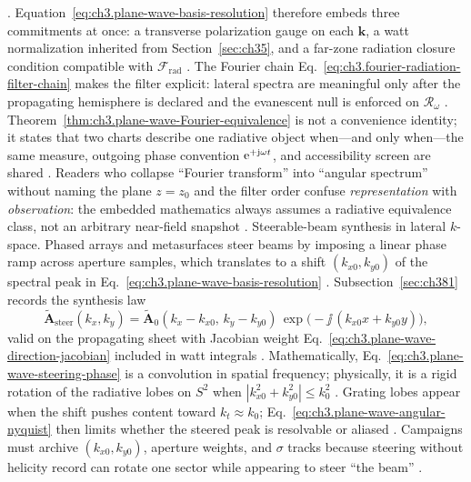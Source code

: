 \cite{harrington2001}. Equation~\eqref{eq:ch3.plane-wave-basis-resolution} therefore embeds three commitments
at once: a transverse polarization gauge on each \(\mathbf{k}\), a watt normalization inherited from
Section~\ref{sec:ch35}, and a far-zone radiation closure condition compatible with \(\mathcal{F}_{\mathrm{rad}}\)
\cite{stratton1941}. The Fourier chain
Eq.~\eqref{eq:ch3.fourier-radiation-filter-chain} makes the filter explicit: lateral spectra are meaningful only after
the propagating hemisphere is declared and the evanescent null is enforced on \(\mathcal{R}_\omega\)
\cite{harrington2001}. Theorem~\ref{thm:ch3.plane-wave-Fourier-equivalence} is not a convenience identity;
it states that two charts describe one radiative object when---and only when---the same measure, outgoing phase
convention $\mathrm{e}^{+\mathrm{j}\omega t}$, and accessibility screen are shared \cite{stratton1941}. Readers who
collapse ``Fourier transform'' into ``angular spectrum'' without naming the plane \(z=z_{0}\) and the filter order
confuse \emph{representation} with \emph{observation}: the embedded mathematics always assumes a radiative equivalence
class, not an arbitrary near-field snapshot \cite{devaney2004}.
Steerable-beam synthesis in lateral \(k\)-space. Phased arrays and metasurfaces steer beams by imposing a linear phase ramp across aperture samples, which translates to a shift
\((k_{x0},k_{y0})\) of the spectral peak in Eq.~\eqref{eq:ch3.plane-wave-basis-resolution} \cite{jackson1999}.
Subsection~\ref{sec:ch381} records the synthesis law
\begin{equation}
\label{eq:ch3.plane-wave-steering-phase}
\widetilde{\mathbf{A}}_{\mathrm{steer}}(k_{x},k_{y})
=
\widetilde{\mathbf{A}}_{0}(k_{x}-k_{x0},\,k_{y}-k_{y0})\,
\exp\!\bigl(-\jj\,(k_{x0}x+k_{y0}y)\bigr),
\end{equation}
valid on the propagating sheet with Jacobian weight Eq.~\eqref{eq:ch3.plane-wave-direction-jacobian} included in watt integrals
\cite{hansen1988}. Mathematically, Eq.~\eqref{eq:ch3.plane-wave-steering-phase} is a convolution in spatial frequency; physically,
it is a rigid rotation of the radiative lobes on \(S^{2}\) when \(|k_{x0}^{2}+k_{y0}^{2}|\le k_{0}^{2}\) \cite{stratton1941}.
Grating lobes appear when the shift pushes content toward \(k_{t}\approx k_{0}\); Eq.~\eqref{eq:ch3.plane-wave-angular-nyquist} then limits
whether the steered peak is resolvable or aliased \cite{hansen1988}. Campaigns must archive \((k_{x0},k_{y0})\), aperture weights, and
\(\sigma\) tracks because steering without helicity record can rotate one sector while appearing to steer ``the beam'' \cite{belinfante1940}.
